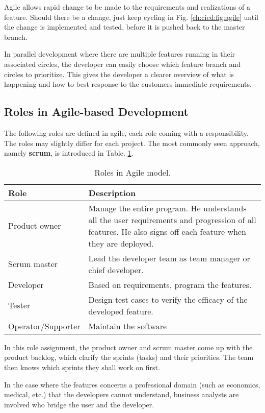 Agile allows rapid change to be made to the requirements and realizations of a feature. Should there be a change, just keep cycling in Fig. \ref{ch:cicd:fig:agile} until the change is implemented and tested, before it is pushed back to the master branch.

In parallel development where there are multiple features running in their associated circles, the developer can easily choose which feature branch and circles to prioritize. This gives the developer a clearer overview of what is happening and how to best response to the customers immediate requirements.

\subsection{Roles in Agile-based Development}

The following roles are defined in agile, each role coming with a responsibility. The roles may slightly differ for each project. The most commonly seen approach, namely \textbf{scrum}, is introduced in Table. \ref{ch:cicd:tab:agilerole}.
\begin{table}[htbp]
	\centering
	\caption{Roles in Agile model.} \label{ch:cicd:tab:agilerole}
	\begin{tabularx}{\textwidth}{lX}
		\hline
		Role & Description \\
		\hline
		Product owner & Manage the entire program. He understands all the user requirements and progression of all features. He also signs off each feature when they are deployed. \\ \hdashline
		Scrum master & Lead the developer team as team manager or chief developer. \\ \hdashline
		Developer & Based on requirements, program the features. \\ \hdashline
		Tester & Design test cases to verify the efficacy of the developed feature. \\ \hdashline
		Operator/Supporter & Maintain the software \\
		\hline
	\end{tabularx}
\end{table}

In this role assignment, the product owner and scrum master come up with the product backlog, which clarify the sprints (tasks) and their priorities. The team then knows which sprints they shall work on first.

In the case where the features concerns a professional domain (such as economics, medical, etc.) that the developers cannot understand, business analysts are involved who bridge the user and the developer.

